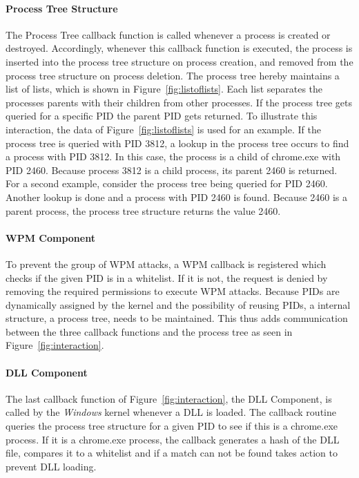 \paragraph{Process Tree Structure}
The Process Tree callback function is called whenever a process is created or destroyed. Accordingly, whenever this callback function is executed, the process is inserted into the process tree structure on process creation, and removed from the process tree structure on process deletion. The process tree hereby maintains a list of lists, which is shown in Figure~\ref{fig:listoflists}.
Each list separates the processes parents with their children from other processes. If the process tree gets queried for a specific \gls{PID} the parent \gls{PID} gets returned. To illustrate this interaction, the data of Figure~\ref{fig:listoflists} is used for an example. If the process tree is queried with \gls{PID} 3812, a lookup in the process tree occurs to find a process with \gls{PID} 3812. In this case, the process is a child of chrome.exe with \gls{PID} 2460.
Because process 3812 is a child process, its parent 2460 is returned. For a second example, consider the process tree being queried for \gls{PID} 2460. Another lookup is done and a process with \gls{PID} 2460 is found. Because 2460 is a parent process, the process tree structure returns the value 2460.

\paragraph{WPM Component}
To prevent the group of \gls{WPM} attacks, a \gls{WPM} callback is registered which checks if the given \gls{PID} is in a whitelist. If it is not, the request is denied by removing the required permissions to execute \gls{WPM} attacks. Because \glspl{PID} are dynamically assigned by the kernel and the possibility of reusing \glspl{PID}, a internal structure, a process tree, needs to be maintained. This thus adds communication between the three callback functions and the process tree as seen in Figure~\ref{fig:interaction}.

\paragraph{DLL Component}
The last callback function of Figure~\ref{fig:interaction}, the DLL Component, is called by the \emph{Windows} kernel whenever a \gls{DLL} is loaded. The callback routine queries the process tree structure for a given \gls{PID} to see if this is a chrome.exe process. If it is a chrome.exe process, the callback generates a hash of the \gls{DLL} file, compares it to a whitelist and if a match can not be found takes action to prevent \gls{DLL} loading.